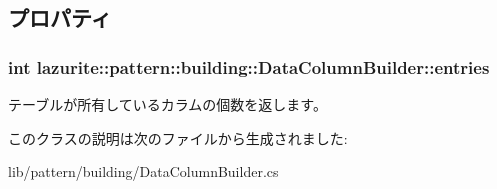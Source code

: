 \subsection{プロパティ}
\hypertarget{classlazurite_1_1pattern_1_1building_1_1_data_column_builder_a6195bbc21ca91e6f5160e89d525a8179}{
\subsubsection[{entries}]{\setlength{\rightskip}{0pt plus 5cm}int lazurite::pattern::building::DataColumnBuilder::entries}}
\label{classlazurite_1_1pattern_1_1building_1_1_data_column_builder_a6195bbc21ca91e6f5160e89d525a8179}


テーブルが所有しているカラムの個数を返します。 

このクラスの説明は次のファイルから生成されました:\begin{DoxyCompactItemize}
\item 
lib/pattern/building/DataColumnBuilder.cs\end{DoxyCompactItemize}
